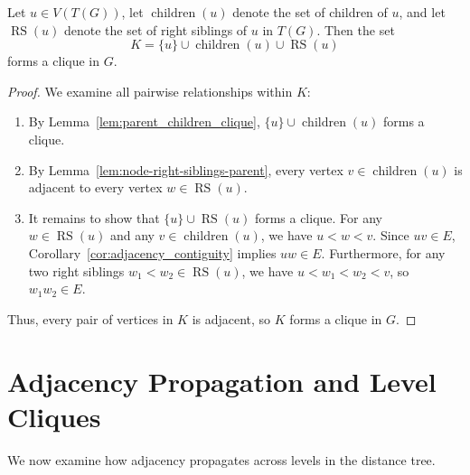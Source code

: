 \begin{lemma}
\label{lem:clique-children-right-siblings}
Let $u \in V(T(G))$, let $\operatorname{children}(u)$ denote the set of children of $u$, and let $\operatorname{RS}(u)$ denote the set of right siblings of $u$ in $T(G)$. Then the set
\begin{equation}
    K = \{u\} \cup \operatorname{children}(u) \cup \operatorname{RS}(u)
\end{equation}
forms a clique in $G$.
\end{lemma}
\begin{proof}
We examine all pairwise relationships within $K$:
\begin{enumerate}
    \item By Lemma~\ref{lem:parent_children_clique}, $\{u\} \cup \operatorname{children}(u)$ forms a clique.
    \item By Lemma~\ref{lem:node-right-siblings-parent}, every vertex $v \in \operatorname{children}(u)$ is adjacent to every vertex $w \in \operatorname{RS}(u)$.
    \item It remains to show that $\{u\} \cup \operatorname{RS}(u)$ forms a clique. For any $w \in \operatorname{RS}(u)$ and any $v \in \operatorname{children}(u)$, we have $u < w < v$. Since $uv \in E$, Corollary~\ref{cor:adjacency_contiguity} implies $uw \in E$. Furthermore, for any two right siblings $w_1 < w_2 \in \operatorname{RS}(u)$, we have $u < w_1 < w_2 < v$, so $w_1 w_2 \in E$.
\end{enumerate}
Thus, every pair of vertices in $K$ is adjacent, so $K$ forms a clique in $G$.
\end{proof}

\section{Adjacency Propagation and Level Cliques}
\label{sec:struct_level_cliques}

We now examine how adjacency propagates across levels in the distance tree.


